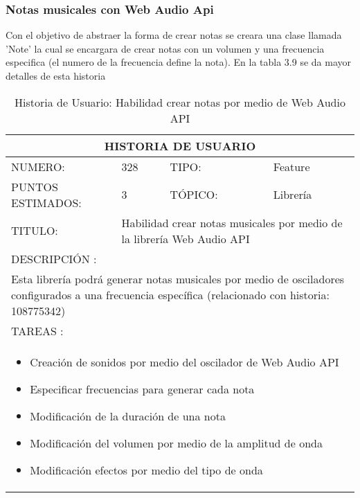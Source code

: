 \subsubsection{Notas musicales con Web Audio Api}

Con el objetivo de abstraer la forma de crear notas se creara una clase llamada
'Note' la cual se encargara de crear notas con un volumen y una frecuencia especifica
(el numero de la frecuencia define la nota). En la tabla 3.9 se da mayor detalles
de esta historia

\begin{table}[h]
\centering
\renewcommand{\arraystretch}{1.4}
\begin{tabular}{|*{4}{l|}}
\hline
\multicolumn{4}{|c|}{HISTORIA DE USUARIO} \\ \hline
NUMERO: & 328 & TIPO: & Feature \\ \hline
PUNTOS ESTIMADOS: & 3 & TÓPICO: & Librería \\ \hline
TITULO: & \multicolumn{3}{|p{7.2cm}|}{Habilidad crear notas musicales por medio de la librería Web Audio API} \\ \hline
\multicolumn{4}{|l|}{DESCRIPCIÓN : } \\ \hline
\multicolumn{4}{|p{11cm}|}{Esta librería podrá generar notas musicales por medio de osciladores configurados a una frecuencia específica (relacionado con historia: 108775342)} \\ \hline
\multicolumn{4}{|l|}{TAREAS : } \\ \hline
\multicolumn{4}{|p{11cm}|}{
\begin{minipage}[t]{\hsize}
  \begin{itemize}
    \item Creación de sonidos por medio del oscilador de Web Audio API
    \item Especificar frecuencias para generar cada nota
    \item Modificación de la duración de una nota
    \item Modificación del volumen por medio de la amplitud de onda
    \item Modificación efectos por medio del tipo de onda
  \end{itemize}
\end{minipage}
} \\ \hline
\end{tabular}
\caption{Historia de Usuario: Habilidad crear notas por medio de Web Audio API}
\label{tab:Primero}
\end{table}

